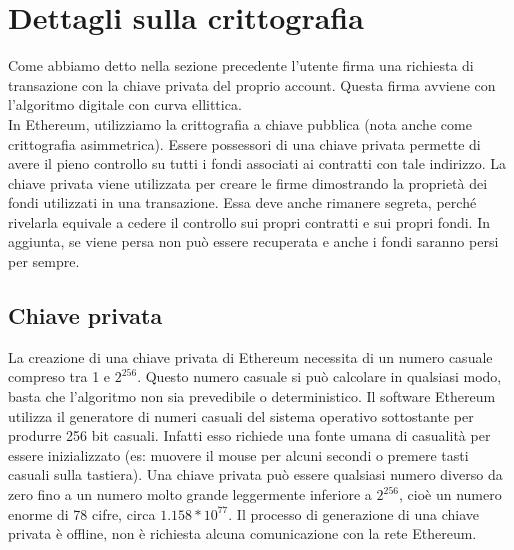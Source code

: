 \documentclass[a4paper,11pt]{report}
\begin{document}
\section{Dettagli sulla crittografia}
Come abbiamo detto nella sezione precedente l'utente firma una richiesta di transazione con la chiave privata del proprio account. Questa firma avviene con l'algoritmo digitale con curva ellittica.\\
In Ethereum, utilizziamo la crittografia a chiave pubblica (nota anche come crittografia asimmetrica).
Essere possessori di una chiave privata permette di avere il pieno controllo su tutti i fondi associati ai contratti con tale indirizzo. 
La chiave privata viene utilizzata per creare le firme dimostrando la proprietà dei fondi utilizzati in una transazione. Essa deve anche rimanere segreta, perché rivelarla equivale a cedere il controllo sui propri contratti e sui propri fondi. In aggiunta, se viene persa non può essere recuperata e anche i fondi saranno persi per sempre.\\

\subsection{Chiave privata}
La creazione di una chiave privata di Ethereum necessita di un numero casuale compreso tra 1 e $2^{256}$. Questo numero casuale si può calcolare in qualsiasi modo, basta che l'algoritmo non sia prevedibile o deterministico. Il software Ethereum utilizza il generatore di numeri casuali del sistema operativo sottostante per produrre 256 bit casuali. Infatti esso richiede una fonte umana di casualità per essere inizializzato (es: muovere il mouse per alcuni secondi o premere tasti casuali sulla tastiera).
Una chiave privata può essere qualsiasi numero diverso da zero fino a un numero molto grande leggermente inferiore a $2^{256}$, cioè un numero enorme di 78 cifre, circa $1.158*10^{77}$.
Il processo di generazione di una chiave privata è offline, non è richiesta alcuna comunicazione con la rete Ethereum. 
\end{document}
